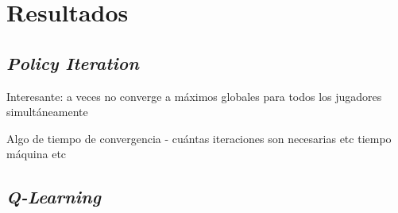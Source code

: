 \chapter{Resultados}

\section{\textit{Policy Iteration}}

Interesante: a veces no converge a m\'aximos globales para todos los jugadores simult\'aneamente

Algo de tiempo de convergencia - cu\'antas iteraciones son necesarias etc tiempo m\'aquina etc


\section{\textit{Q-Learning}}



